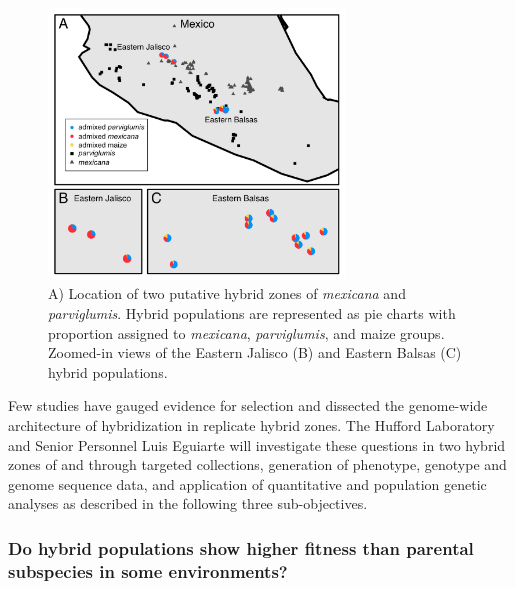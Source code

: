 \begin{figure}[h!]
  \centering
   \includegraphics[width=0.7\textwidth]{Figure1.jpg}
    \caption{A) Location of two putative hybrid zones of \emph{mexicana} and \emph{parviglumis}.  Hybrid populations are represented as pie charts with proportion assigned to \emph{mexicana}, \emph{parviglumis}, and maize groups. Zoomed-in views of the Eastern Jalisco (B) and Eastern Balsas (C) hybrid populations.} 
\label{fig:pies}
\end{figure}

Few studies have gauged evidence for selection and dissected the genome-wide architecture of hybridization in replicate hybrid zones.
The Hufford Laboratory and Senior Personnel Luis Eguiarte will investigate these questions in two hybrid zones of \zm{} and \zp{} through targeted collections, generation of phenotype, genotype and genome sequence data, and application of quantitative and population genetic analyses as described in the following three sub-objectives.

\subsubsection{Do hybrid populations show higher fitness than parental subspecies in some environments?} 
\label{sss:fitness}

